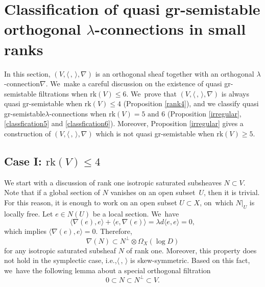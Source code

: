 \documentclass[11pt]{article}
\newcommand{\ie}{i.e.,\xspace}
\numberwithin{equation}{section}
\newcommand{\lconnection}{$\lambda$\nobreakdash-con\-nec\-tion\xspace}
\newcommand{\lconnections}{$\lambda$\nobreakdash-con\-nec\-tions\xspace}
\newcommand{\grsemistable}{gr\nobreakdash-semi\-stable\xspace}
\newcommand{\rk}{\mathrm{rk}}
\theoremstyle{plain}
\theoremstyle{definition}
\begin{document}
\section{Classification of quasi \texorpdfstring{\protect\grsemistable}{grsemistable} orthogonal \texorpdfstring{\protect\lconnections}{lconnections} in small ranks}\label{sect_small_rank}

In this section, $(V, \langle \,, \, \rangle, \nabla)$ is an orthogonal sheaf together with an orthogonal \lconnection $\nabla$. We~make a careful discussion on the existence of quasi \grsemistable filtrations when $\rk (V) \leq 6$. We~prove that $(V, \langle \,, \, \rangle, \nabla)$ is always quasi \grsemistable when $\rk(V) \leq 4$ (Proposition \ref{rank4}), and we classify quasi \grsemistable \lconnections when $\rk(V) = 5 \text{ and }6$ (Proposition \ref{irregular}, \ref{classfication5} and \ref{classfication6}). Moreover, Proposition \ref{irregular} gives a construction of $(V, \langle \,, \, \rangle, \nabla)$ which is not quasi \grsemistable when $\rk(V) \geq 5$.

\subsection{Case I: ${\rk(V) \leq 4}$}
We start with a discussion of rank one isotropic saturated subsheaves $N\subset V$. Note that if a global section of $N$ vanishes on an open subset~$U$, then it is trivial. For this reason, it is enough to work on an open subset $U \subset X$, on~which $N|_U$ is locally free. Let $e \in N(U)$ be a local section. We~have
\[
\langle \nabla(e),e \rangle+\langle e,\nabla(e) \rangle=\lambda d\langle e,e \rangle=0,
\]
which implies $\langle \nabla(e),e \rangle=0$. Therefore,
\[
\nabla(N)\subset N^\perp\otimes\Omega_X(\log D)
\]
for any isotropic saturated subsheaf $N$ of rank one. Moreover, this property does not hold in the symplectic case, \ie $\langle \,, \, \rangle$ is skew-symmetric. Based on this fact, we~have the following lemma about a special orthogonal filtration
\[
0\subset N\subset N^\perp\subset V.
\] 
\end{document}
